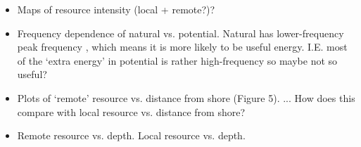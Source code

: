 \begin{itemize}
\item Maps of resource intensity (local + remote?)?
\item Frequency dependence of natural vs. potential. Natural has lower-frequency peak frequency , which means it is more likely to be useful energy. I.E. most of the `extra energy' in potential is rather high-frequency so maybe not so useful?
\item Plots of ‘remote’ resource vs. distance from shore (Figure 5). ... How does this compare with local resource vs. distance from shore?
\item Remote resource vs. depth. Local resource vs. depth.
\end{itemize}



